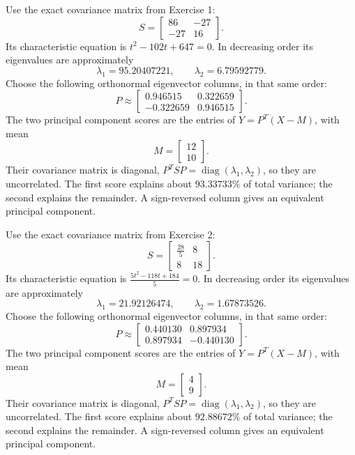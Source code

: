 Use the exact covariance matrix from Exercise 1:
\[S=\begin{bmatrix}86&-27\\-27&16\end{bmatrix}.\]
Its characteristic equation is $t^{2} - 102 t + 647=0$. In decreasing order its eigenvalues are approximately
\[\lambda_1=95.20407221,\qquad\lambda_2=6.79592779.\]
Choose the following orthonormal eigenvector columns, in that same order:
\[P\approx\begin{bmatrix}0.946515&0.322659\\-0.322659&0.946515\end{bmatrix}.\]
The two principal component scores are the entries of $Y=P^T(X-M)$, with mean
\[M=\begin{bmatrix}12\\10\end{bmatrix}.\]
Their covariance matrix is diagonal, $P^TSP=\operatorname{diag}(\lambda_1,\lambda_2)$, so they are uncorrelated. The first score explains about $93.33733\%$ of total variance; the second explains the remainder. A sign-reversed column gives an equivalent principal component.

Use the exact covariance matrix from Exercise 2:
\[S=\begin{bmatrix}\frac{28}{5}&8\\8&18\end{bmatrix}.\]
Its characteristic equation is $\frac{5 t^{2} - 118 t + 184}{5}=0$. In decreasing order its eigenvalues are approximately
\[\lambda_1=21.92126474,\qquad\lambda_2=1.67873526.\]
Choose the following orthonormal eigenvector columns, in that same order:
\[P\approx\begin{bmatrix}0.440130&0.897934\\0.897934&-0.440130\end{bmatrix}.\]
The two principal component scores are the entries of $Y=P^T(X-M)$, with mean
\[M=\begin{bmatrix}4\\9\end{bmatrix}.\]
Their covariance matrix is diagonal, $P^TSP=\operatorname{diag}(\lambda_1,\lambda_2)$, so they are uncorrelated. The first score explains about $92.88672\%$ of total variance; the second explains the remainder. A sign-reversed column gives an equivalent principal component.

